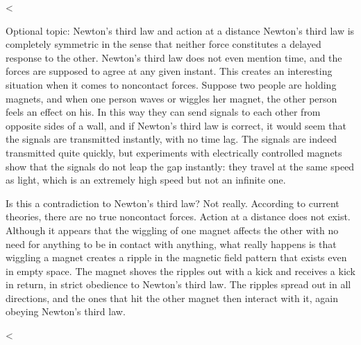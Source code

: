 <%
\begin{margtopic}{Optional topic: Newton's third law and action at a distance}
Newton's third law is completely symmetric in the sense that
neither force constitutes a delayed response to the other.
Newton's third law does not even mention time, and the
forces are supposed to agree at any given instant. This
creates an interesting situation when it comes to noncontact
forces. Suppose two people are holding magnets, and when one
person waves or wiggles her magnet, the other person feels
an effect on his. In this way they can send signals to each
other from opposite sides of a wall, and if Newton's third
law is correct, it would seem that the signals are
transmitted instantly, with no time lag. The signals are
indeed transmitted quite quickly, but experiments with
electrically controlled magnets show that the signals do
not leap the gap instantly: they travel at the same speed as
light, which is an extremely high speed but not an infinite one.

Is this a contradiction to Newton's third law? Not really.
According to current theories, there are no true noncontact
forces. Action at a distance does not exist. Although it
appears that the wiggling of one magnet affects the other
with no need for anything to be in contact with anything,
what really happens is that wiggling a magnet creates a ripple
in the magnetic field pattern that exists even in empty space. The magnet shoves
the ripples out with a kick and receives a kick in return,
in strict obedience to Newton's third law. The ripples spread
out in all directions, and the ones that hit the other
magnet then interact with it, again obeying Newton's third law.
\end{margtopic}
<%

